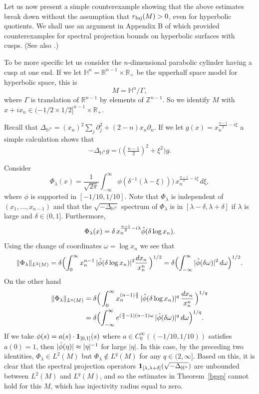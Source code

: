 \documentclass[10pt]{amsart}
\newcommand{\la}{\lambda}
\newcommand{\Inj}{r_{\rm{Inj}}}
\newcommand{\one}{{\bf 1}}
\newcommand{\1}{{\bf 1}}
\newcommand{\R}{{\mathbb R}}
\begin{document}
Let us now present a simple counterexample showing that the above estimates break down without the assumption that
$\Inj(M)>0$, even for hyperbolic quotients.  We shall use an argument in Appendix B of \cite{AGL} which provided counterexamples
for spectral projection bounds on hyperbolic surfaces with cusps.  (See also \cite[\S5.3]{Borthwick}.)


To be more specific let us consider the $n$-dimensional parabolic cylinder having a cusp at one end.  If we let
${\mathbb H}^n={\mathbb R}^{n-1}\times \R_+$ be the upperhalf space model for hyperbolic space, this is
$$M={\mathbb H}^n/\Gamma,$$
where $\Gamma$ is translation of ${\mathbb R}^{n-1}$ by elements of ${\mathbb Z}^{n-1}$.  So we identify 
$M$ with $x+ix_n\in {(-1/2\times 1/2]}^{n-1}\times \R_+$. 


Recall that $\Delta_{{\mathbb H}^n}=(x_n)^2\sum_j \partial_j^2+(2-n)x_n\partial_n$.  
If we let $g(x)=x_n^{\frac{n-1}2-i\xi}$ a simple calculation shows that
$$-\Delta_{{\mathbb H}^n}g=\bigl( (\tfrac{n-1}2)^2+\xi^2\bigr) g.$$


Consider
$$\Phi_\la(x)=\frac1{\sqrt{2\pi}} \int_{-\infty}^\infty \phi(\delta^{-1}(\la-\xi))) \, x_n^{\frac{n-1}2-i\xi} \, d\xi,$$
where $\phi$ is supported in $[-1/10,1/10]$.  Note that $\Phi_\la$ is independent of
$(x_1,\dots,x_{n-1})$ and that
the $\sqrt{-\Delta_{{\mathbb H}^n}}$   spectrum of $\Phi_\la$ is in $[\la-\delta,\la+\delta]$
if $\la$ is large and $\delta\in (0,1]$.  Furthermore,
$$\Phi_\la(x)=\delta\,  x_n^{\frac{n-1}2-i\la}\Hat \phi(\delta \log x_n).$$
Using the change of coordinates $\omega =\log x_n$ we see that 
$$\|\Phi_\la\|_{L^2(M)}=\delta \Bigl(\int_0^\infty x_n^{n-1} \, |\Hat \phi(\delta \log x_n)|^2 \frac{dx_n}{x_n^n}\, \Bigr)^{1/2}
=\delta \Bigl(\int_{-\infty}^\infty |\Hat\phi (\delta \omega)|^2 \, d\omega \Bigr)^{1/2}.$$
On the other hand
\begin{align*}\|\Phi_\la\|_{L^q(M)}&=\delta \Bigl(\, \int_0^\infty x_n^{(n-1)\frac{q}2} \, |\Hat \phi(\delta \log x_n)|^q \, \frac{dx_n}{x_n^n} \, \Bigr)^{1/q}
\\
&=
\delta\Bigl( \int _{-\infty}^\infty e^{(\frac{q}2-1)(n-1)\omega} \, |\Hat \phi(\delta \omega)|^q \, d\omega\Bigr)^{1/q}.
\end{align*}
If we take $\phi(s)=a(s) \cdot \one_{[0,1]}(s)$ where $a\in C^\infty_0((-1/10,1/10))$ satisfies $a(0)=1$, then
$|\Hat \phi(\eta)|\approx |\eta|^{-1}$ for large $|\eta|$.  In this case, by the preceding two identities, $\Phi_\la\in L^2(M)$ but
$\Phi_\la\notin L^q(M)$ for any $q\in (2,\infty]$.  Based on this, it is clear that the spectral projection operators
$\one_{[\la,\la+\delta]}(\sqrt{-\Delta_{{\mathbb H}^n}})$ are unbounded between $L^2(M)$ and $L^q(M)$, and so
the estimates in Theorem~\ref{bgsp} cannot hold for this $M$, which has injectivity radius equal to zero.
\end{document}
